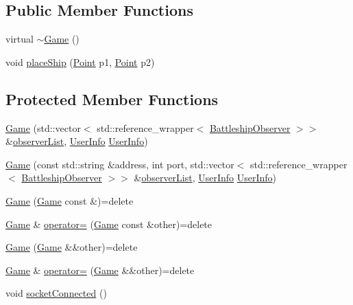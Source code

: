 \subsection*{Public Member Functions}
\begin{DoxyCompactItemize}
\item 
virtual \hyperlink{classMODEL_1_1Game_ac168f724bc6694d4f9d4c87f8c0189ba}{$\sim$\+Game} ()
\item 
void \hyperlink{classMODEL_1_1Game_a3a9f3966eb6f57eac31e4d6244c07c58}{place\+Ship} (\hyperlink{classMODEL_1_1Point}{Point} p1, \hyperlink{classMODEL_1_1Point}{Point} p2)
\end{DoxyCompactItemize}
\subsection*{Protected Member Functions}
\begin{DoxyCompactItemize}
\item 
\hyperlink{classMODEL_1_1Game_a12daf58e448825c36267d00317e106ab}{Game} (std\+::vector$<$ std\+::reference\+\_\+wrapper$<$ \hyperlink{classBattleshipObserver}{Battleship\+Observer} $>$$>$ \&\hyperlink{classMODEL_1_1Game_afada2cb52f9872db4f3ab6e72d07cd05}{observer\+List}, \hyperlink{classUserInfo}{User\+Info} \hyperlink{classUserInfo}{User\+Info})
\item 
\hyperlink{classMODEL_1_1Game_a088a17112f1a818f00c0da4bd4d18c1c}{Game} (const std\+::string \&address, int port, std\+::vector$<$ std\+::reference\+\_\+wrapper$<$ \hyperlink{classBattleshipObserver}{Battleship\+Observer} $>$$>$ \&\hyperlink{classMODEL_1_1Game_afada2cb52f9872db4f3ab6e72d07cd05}{observer\+List}, \hyperlink{classUserInfo}{User\+Info} \hyperlink{classUserInfo}{User\+Info})
\item 
\hyperlink{classMODEL_1_1Game_aade93aad98ae9bc9931236d08f48fcf3}{Game} (\hyperlink{classMODEL_1_1Game}{Game} const \&)=delete
\item 
\hyperlink{classMODEL_1_1Game}{Game} \& \hyperlink{classMODEL_1_1Game_a09ee8455dc72eb38e41bb59d70158bb1}{operator=} (\hyperlink{classMODEL_1_1Game}{Game} const \&other)=delete
\item 
\hyperlink{classMODEL_1_1Game_a71b42b0e2d234b1240823a01cfd13e66}{Game} (\hyperlink{classMODEL_1_1Game}{Game} \&\&other)=delete
\item 
\hyperlink{classMODEL_1_1Game}{Game} \& \hyperlink{classMODEL_1_1Game_ad1c94ba579ec1ea46b7a534b3443199d}{operator=} (\hyperlink{classMODEL_1_1Game}{Game} \&\&other)=delete
\item 
void \hyperlink{classMODEL_1_1Game_a7e0a9af181a76ce2bf8ce1e11f5e03ab}{socket\+Connected} ()
\end{DoxyCompactItemize}
